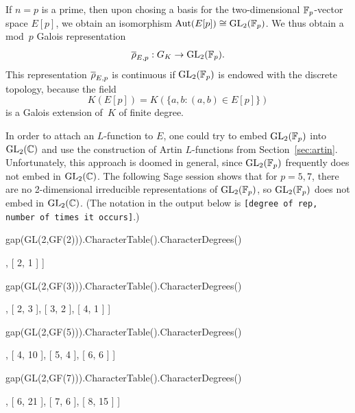 If $n=p$ is a prime, then upon chosing a basis for the two-dimensional
$\mathbb{F}_p$-vector space $E[p]$, we obtain an isomorphism $\operatorname{Aut}(E[p]) \cong
\operatorname{GL}_2(\mathbb{F}_p)$.  We thus obtain a mod~$p$ Galois representation
$$
 \overline{\rho}_{E,p} : G_K \to \operatorname{GL}_2(\mathbb{F}_p).
$$
This representation $\overline{\rho}_{E,p}$ is continuous if $\operatorname{GL}_2(\mathbb{F}_p)$ is endowed with the
discrete topology, because the field
$$
 K(E[p]) = K(\{a,b : (a,b) \in E[p]\})
$$
is a Galois extension of~$K$ of finite degree.

In order to attach an $L$-function to $E$, one could try to embed
$\operatorname{GL}_2(\mathbb{F}_p)$ into $\operatorname{GL}_2(\mathbb{C})$ and use the construction of Artin
$L$-functions from Section~\ref{sec:artin}.
Unfortunately, this approach is doomed in general, since
$\operatorname{GL}_2(\mathbb{F}_p)$ frequently does not embed in $\operatorname{GL}_2(\mathbb{C})$.
The following Sage session shows that for $p=5,7$, there are
no 2-dimensional irreducible representations of $\operatorname{GL}_2(\mathbb{F}_p)$,
so $\operatorname{GL}_2(\mathbb{F}_p)$ does not embed in $\operatorname{GL}_2(\mathbb{C})$.
(The notation in the output below is {\tt [degree of rep, number of times it occurs]}.)
\begin{sagecode}
\begin{sagecell} %
gap(GL(2,GF(2))).CharacterTable().CharacterDegrees()
\end{sagecell}
\begin{sageout}
[ [ 1, 2 ], [ 2, 1 ] ]
\end{sageout}
\begin{sagecell} %
gap(GL(2,GF(3))).CharacterTable().CharacterDegrees()
\end{sagecell}
\begin{sageout}
[ [ 1, 2 ], [ 2, 3 ], [ 3, 2 ], [ 4, 1 ] ]
\end{sageout}
\begin{sagecell} %
gap(GL(2,GF(5))).CharacterTable().CharacterDegrees()
\end{sagecell}
\begin{sageout}
[ [ 1, 4 ], [ 4, 10 ], [ 5, 4 ], [ 6, 6 ] ]
\end{sageout}
\begin{sagecell} %
gap(GL(2,GF(7))).CharacterTable().CharacterDegrees()
\end{sagecell}
\begin{sageout}
[ [ 1, 6 ], [ 6, 21 ], [ 7, 6 ], [ 8, 15 ] ]
\end{sageout}
\end{sagecode}

